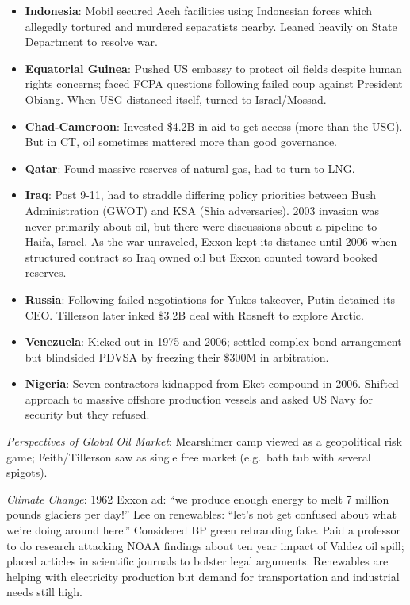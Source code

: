 \documentclass[
]{article}
\begin{document}
\begin{itemize}
\item
  \textbf{Indonesia}: Mobil secured Aceh facilities using Indonesian
  forces which allegedly tortured and murdered separatists nearby.
  Leaned heavily on State Department to resolve war.
\item
  \textbf{Equatorial Guinea}: Pushed US embassy to protect oil fields
  despite human rights concerns; faced FCPA questions following failed
  coup against President Obiang. When USG distanced itself, turned to
  Israel/Mossad.
\item
  \textbf{Chad-Cameroon}: Invested \$4.2B in aid to get access (more
  than the USG). But in CT, oil sometimes mattered more than good
  governance.
\item
  \textbf{Qatar}: Found massive reserves of natural gas, had to turn to
  LNG.
\item
  \textbf{Iraq}: Post 9-11, had to straddle differing policy priorities
  between Bush Administration (GWOT) and KSA (Shia adversaries). 2003
  invasion was never primarily about oil, but there were discussions
  about a pipeline to Haifa, Israel. As the war unraveled, Exxon kept
  its distance until 2006 when structured contract so Iraq owned oil but
  Exxon counted toward booked reserves.
\item
  \textbf{Russia}: Following failed negotiations for Yukos takeover,
  Putin detained its CEO. Tillerson later inked \$3.2B deal with Rosneft
  to explore Arctic.
\item
  \textbf{Venezuela}: Kicked out in 1975 and 2006; settled complex bond
  arrangement but blindsided PDVSA by freezing their \$300M in
  arbitration.
\item
  \textbf{Nigeria}: Seven contractors kidnapped from Eket compound in
  2006. Shifted approach to massive offshore production vessels and
  asked US Navy for security but they refused.
\end{itemize}

\emph{Perspectives of Global Oil Market}: Mearshimer camp viewed as a
geopolitical risk game; Feith/Tillerson saw as single free market
(e.g.~bath tub with several spigots).

\emph{Climate Change}: 1962 Exxon ad: ``we produce enough energy to melt
7 million pounds glaciers per day!'' Lee on renewables: ``let's not get
confused about what we're doing around here.'' Considered BP green
rebranding fake. Paid a professor to do research attacking NOAA findings
about ten year impact of Valdez oil spill; placed articles in scientific
journals to bolster legal arguments. Renewables are helping with
electricity production but demand for transportation and industrial
needs still high.
\end{document}
